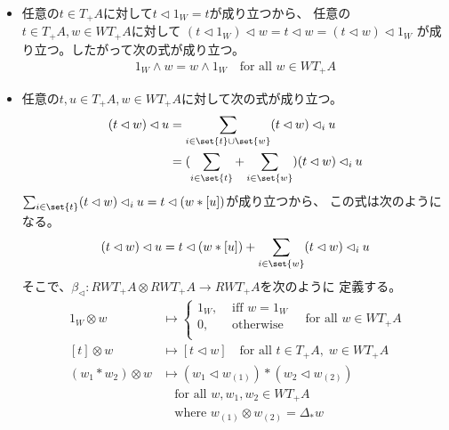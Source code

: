 		\begin{itemize}\setlength{\itemsep}{-1mm} %
			\item 任意の$t\in T_+A$に対して$t\lhd 1_W=t$が成り立つから、
			任意の$t\in T_+A,w\in WT_+A$に対して
			$(t\lhd 1_W)\lhd w=t\lhd w=(t\lhd w)\lhd 1_W$
			が成り立つ。したがって次の式が成り立つ。
			\begin{equation*}\begin{split} %
				1_W\land w = w\land 1_W \quad\text{for all }w\in WT_+A
			\end{split}\end{equation*} %
			\item 任意の$t,u\in T_+A,w\in WT_+A$に対して次の式が成り立つ。
			\begin{equation*}\begin{split} %
				(t\lhd w)\lhd u 
				&= \sum_{i\in \set{t}\cup \set{w}}(t\lhd w)\lhd_i u \\
				&= (\sum_{i\in \set{t}}+\sum_{i\in \set{w}})(t\lhd w)\lhd_i u \\
			\end{split}\end{equation*} %
			$\sum_{i\in \set{t}}(t\lhd w)\lhd_i u=t\lhd (w*[u])$が成り立つから、
			この式は次のようになる。
			\begin{equation}\label{eq:森の二項演算の確かめその一}\begin{split} %
				(t\lhd w)\lhd u 
				&= t\lhd (w*[u]) + \sum_{i\in \set{w}}(t\lhd w)\lhd_i u \\
			\end{split}\end{equation} %
			そこで、$\beta_\lhd: RWT_+A\otimes RWT_+A\to RWT_+A$を次のように
			定義する。
			\begin{equation}\label{eq:森への接木の定義}\begin{split} %
				1_W\otimes w &\mapsto \begin{cases} %
					1_W, &\text{ iff }w=1_W \\
					0, &\text{ otherwise } \\
				\end{cases} %
				\quad\text{for all }w\in WT_+A \\
				[t]\otimes w &\mapsto [t\lhd w]
				\quad\text{for all }t\in T_+A,\;w\in WT_+A \\
				(w_1*w_2)\otimes w &\mapsto (w_1\lhd w_{(1)})*(w_2\lhd w_{(2)}) \\
				&\quad\text{for all }w,w_1,w_2\in WT_+A \\
				&\quad\text{where }w_{(1)}\otimes w_{(2)}=\Delta_*w

\end{split}
\end{equation}
\end{itemize}
